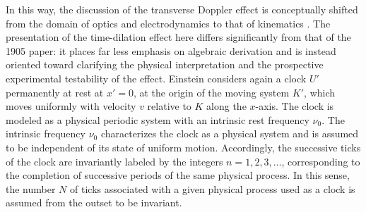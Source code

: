 \documentclass[pdflatex,sn-basic]{sn-jnl}
\begin{document}

In this way, the discussion of the transverse Doppler effect is conceptually shifted from the domain of optics and electrodynamics to that of kinematics \citep[421-22]{Einstein1908}. The presentation of the time-dilation effect here differs significantly from that of the 1905 paper: it places far less emphasis on algebraic derivation and is instead oriented toward clarifying the physical interpretation and the prospective experimental testability of the effect.  Einstein considers again a clock $U'$ permanently at rest at $x'=0$, at the origin of the moving system $K'$, which moves uniformly with velocity $v$ relative to $K$ along the $x$-axis. The clock is modeled as a physical periodic system with an intrinsic rest frequency $\nu_0$. The intrinsic frequency $\nu_0$ characterizes the clock as a physical system and is assumed to be independent of its state of uniform motion. Accordingly, the successive ticks of the clock are invariantly labeled by the integers $n=1,2,3,\ldots$, corresponding to the completion of successive periods of the same physical process. In this sense, the number $N$ of ticks associated with a given physical process used as a clock is assumed from the outset to be invariant.
\end{document}
